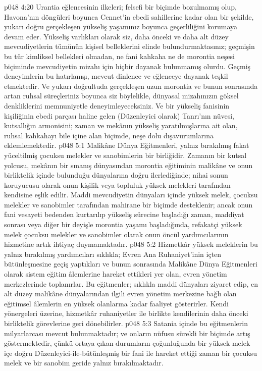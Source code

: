 \vs p048 4:20 Urantia eğlencesinin ilkeleri; felsefi bir biçimde bozulmamış olup, Havona’nın döngüleri boyunca Cennet’in ebedi sahillerine kadar olan bir şekilde, yukarı doğru gerçekleşen yükseliş yaşamınız boyunca geçerliliğini korumaya devam eder. Yükseliş varlıkları olarak siz, daha önceki ve daha alt düzey mevcudiyetlerin tümünün kişisel belleklerini elinde bulundurmaktasınız; geçmişin bu tür kimliksel bellekleri olmadan, ne fani kahkaha ne de morontia neşesi biçiminde mevcudiyetin mizahı için hiçbir dayanak bulunmamış olurdu. Geçmiş deneyimlerin bu hatırlanışı, mevcut dinlence ve eğlenceye dayanak teşkil etmektedir. Ve yukarı doğrultuda gerçekleşen uzun morontia ve bunun sonrasında artan ruhsal süreçleriniz boyunca siz böylelikle, dünyasal mizahınızın göksel denkliklerini memnuniyetle deneyimleyeceksiniz. Ve bir yükseliş fanisinin kişiliğinin ebedi parçası haline gelen (Düzenleyici olarak) Tanrı’nın nüvesi, kutsallığın armonisini; zaman ve mekânın yükseliş yaratılmışlarına ait olan, ruhsal kahkahayı bile içine alan biçimde, neşe dolu dışavurumlarına eklemlemektedir.
\vs p048 5:1 Malikâne Dünya Eğitmenleri, yalnız bırakılmış fakat yüceltilmiş çocuksu melekler ve sanobimlerin bir birliğidir. Zamanın bir kutsal yolcusu, mekânın bir sınanış dünyasından morontia eğitiminin malikâne ve onun birliktelik içinde bulunduğu dünyalarına doğru ilerlediğinde; nihai sonun koruyucusu olarak onun kişilik veya topluluk yüksek melekleri tarafından kendisine eşlik edilir. Maddi mevcudiyetin dünyaları içinde yüksek melek, çocuksu melekler ve sanobimler tarafından mahirane bir biçimde desteklenir; ancak onun fani vesayeti bedenden kurtarılıp yükseliş sürecine başladığı zaman, maddiyat sonrası veya diğer bir deyişle morontia yaşamı başladığında, refakatçi yüksek melek çocuksu melekler ve sanobimler olarak onun öncül yardımcılarının hizmetine artık ihtiyaç duymamaktadır.
\vs p048 5:2 Hizmetkâr yüksek meleklerin bu yalnız bırakılmış yardımcıları sıklıkla; Evren Ana Ruhaniyet’inin içten bütünleşmesine geçiş yaptıkları ve bunun sonrasında Malikâne Dünya Eğitmenleri olarak sistem eğitim âlemlerine hareket ettikleri yer olan, evren yönetim merkezlerinde toplanırlar. Bu eğitmenler; sıklıkla maddi dünyaları ziyaret edip, en alt düzey malikâne dünyalarından ilgili evren yönetim merkezine bağlı olan eğitimsel âlemlerin en yüksek olanlarına kadar faaliyet gösterirler. Kendi yönergeleri üzerine, hizmetkâr ruhaniyetler ile birlikte kendilerinin daha önceki birliktelik görevlerine geri dönebilirler.
\vs p048 5:3 Satania içinde bu eğitmenlerin milyarlarcası mevcut bulunmaktadır; ve onların nüfusu sürekli bir biçimde artış göstermektedir, çünkü ortaya çıkan durumların çoğunluğunda bir yüksek melek içe doğru Düzenleyici\hyp{}ile\hyp{}bütünleşmiş bir fani ile hareket ettiği zaman bir çocuksu melek ve bir sanobim geride yalnız bırakılmaktadır.
